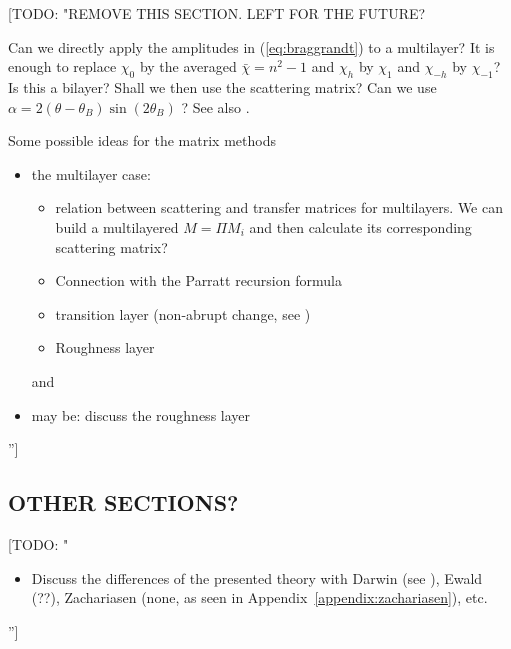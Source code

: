 \documentclass[preprint]{iucr}              %
\newcommand{\todo}[1]{{\color{red}[TODO: "#1'']}}
\newcommand{\inred}[1]{{\color{red}#1}}
\begin{document}
\todo{REMOVE THIS SECTION. LEFT FOR THE FUTURE?

Can we directly apply the amplitudes in (\ref{eq:braggrandt}) to a multilayer? It is enough to replace $\chi_0$ by the averaged $\bar{\chi}=n^2-1$ and $\chi_h$ by $\chi_1$ and $\chi_{-h}$ by $\chi_{-1}$? Is this a bilayer? Shall we then use the scattering matrix? 
Can we use $\alpha=2(\theta-\theta_B)\sin(2\theta_B)$ ?
See also \cite{Osterhoff2012,Osterhoff2013}.

Some possible ideas for the matrix methods
\begin{itemize}
    \item the multilayer case:
    \begin{itemize}
        \item relation between scattering and transfer matrices for multilayers. We can build a multilayered $M=\Pi M_i$ and then calculate its corresponding scattering matrix?
        \item Connection with the Parratt recursion formula
        \item transition layer (non-abrupt change, see \cite{Lobach})
        \item Roughness layer
    \end{itemize}and 
    \item may be: discuss the roughness layer

\end{itemize}
}

\inred{
\subsection{OTHER SECTIONS?}
}

\todo{
\begin{itemize}
    \item Discuss the differences of the presented theory with Darwin (see \cite{Yashiro2000, Yashiro2001}), Ewald (??), Zachariasen (none, as seen in Appendix~\ref{appendix:zachariasen}), etc. 
\end{itemize}
}

\end{document}

